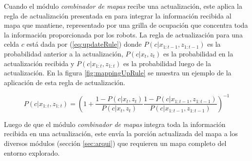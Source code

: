 
Cuando el módulo \emph{combinador de mapas} recibe una actualización, este
aplica la regla de actualización presentada en \cite{stachniss2009robotic} para
integrar la información recibida al mapa que mantiene, representado por una
grilla de ocupación que concentra toda la información proporcionada por los
robots. La regla de actualización para una celda $c$ está dada por
(\ref{eq:updateRule}) donde $P(c|x_{1:t-1},z_{1:t-1})$ es la probabilidad
anterior a la actualización, $P(c | x_t,z_t)$ es la probabilidad en la
actualización recibida y  $P(c|x_{1:t},z_{1:t})$ es la probabilidad luego de la
actualización. En la figura \ref{fig:mappingUpRule} se muestra un ejemplo de la
aplicación de esta regla de actualización. 

\begin{equation}
  P(c|x_{1:t},z_{1:t}) =\left( 1 + \frac{1 - P(c | x_t,z_t)}{P(c|x_t,z_t)} \frac{1 - P(c|x_{1:t-1},z_{1:t-1})}{P(c|x_{1:t-1},z_{1:t-1})} \right)^{-1}
\label{eq:updateRule}
\end{equation}


Luego de que el módulo \emph{combinador de mapas} integra toda la información
recibida en una actualización, este envía la porción actualizada del mapa a los
diversos módulos (sección \ref{sec:arqui}) que requieren un mapa
completo del entorno explorado.

